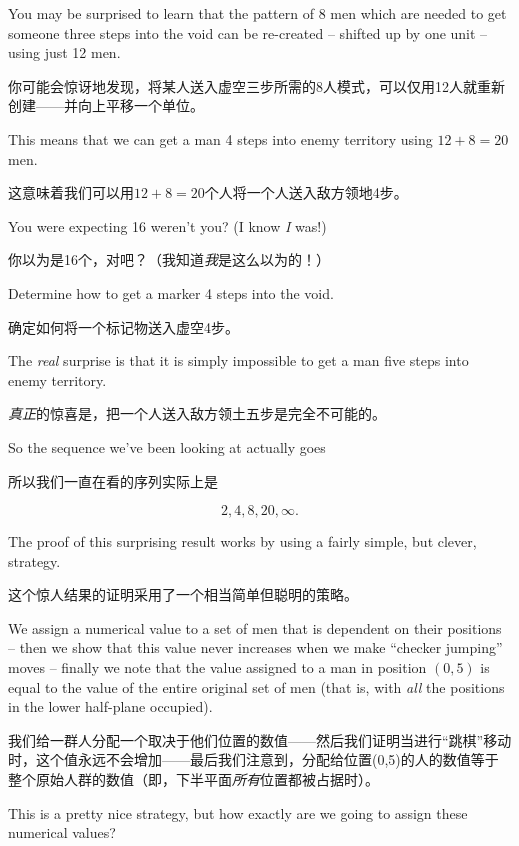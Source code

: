 You may be surprised to learn that the pattern of 8 men which are needed to
get someone three steps into the void can be re-created -- shifted up by one
unit -- using just 12 men.

你可能会惊讶地发现，将某人送入虚空三步所需的8人模式，可以仅用12人就重新创建——并向上平移一个单位。

This means that we can get a man 4 steps into
enemy territory using $12 + 8 = 20$ men.

这意味着我们可以用$12 + 8 = 20$个人将一个人送入敌方领地4步。

You were expecting 16 weren't you?
(I know \emph{I} was!)

你以为是16个，对吧？（我知道\emph{我}是这么以为的！）

\begin{exer}
Determine how to get a marker 4 steps into the void.
\end{exer}

\begin{exer}
确定如何将一个标记物送入虚空4步。
\end{exer}

The \emph{real} surprise is that it is simply impossible to get a man five
steps into enemy territory.

\emph{真正}的惊喜是，把一个人送入敌方领土五步是完全不可能的。

So the sequence we've been looking at actually
goes 

所以我们一直在看的序列实际上是

\[ 2, 4, 8, 20, \infty. \] 

The proof of this surprising result works by using a fairly simple, but
clever, strategy.

这个惊人结果的证明采用了一个相当简单但聪明的策略。

We assign a numerical value to a set of men that is 
dependent on their positions -- then we show that this value never increases
when we make ``checker jumping'' moves -- finally we note that the 
value assigned to a man in position $(0,5)$ is equal to the value of the
entire original set of men (that is, with \emph{all} the positions in the lower
half-plane occupied).

我们给一群人分配一个取决于他们位置的数值——然后我们证明当进行“跳棋”移动时，这个值永远不会增加——最后我们注意到，分配给位置(0,5)的人的数值等于整个原始人群的数值（即，下半平面\emph{所有}位置都被占据时）。

This is a pretty nice strategy, but how exactly are
we going to assign these numerical values?

